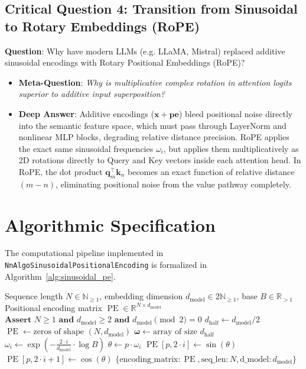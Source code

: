 \documentclass[11pt,a4paper]{article}
\theoremstyle{definition}
\begin{document}
\subsection{\textbf{Critical Question 4: Transition from Sinusoidal to Rotary Embeddings (RoPE)}}
\textbf{Question}: Why have modern LLMs (e.g. LLaMA, Mistral) replaced additive sinusoidal encodings with Rotary Positional Embeddings (RoPE)?
\begin{itemize}
    \item \textbf{Meta-Question}: \emph{Why is multiplicative complex rotation in attention logits superior to additive input superposition?}
    \item \textbf{Deep Answer}: Additive encodings ($\mathbf{x} + \mathbf{pe}$) bleed positional noise directly into the semantic feature space, which must pass through LayerNorm and nonlinear MLP blocks, degrading relative distance precision. RoPE applies the exact same sinusoidal frequencies $\omega_i$, but applies them multiplicatively as 2D rotations directly to Query and Key vectors inside each attention head. In RoPE, the dot product $\mathbf{q}_m^\top \mathbf{k}_n$ becomes an exact function of relative distance $(m-n)$, eliminating positional noise from the value pathway completely.
\end{itemize}

\section{Algorithmic Specification}

The computational pipeline implemented in \texttt{NnAlgoSinusoidalPositionalEncoding} is formalized in Algorithm~\ref{alg:sinusoidal_pe}.

\begin{algorithm}[H]
\caption{Sinusoidal Positional Encoding Generation}
\label{alg:sinusoidal_pe}
\begin{algorithmic}[1]
\Require Sequence length $N \in \mathbb{N}_{\ge 1}$, embedding dimension $d_{\text{model}} \in 2\mathbb{N}_{\ge 1}$, base $B \in \mathbb{R}_{> 1}$
\Ensure Positional encoding matrix $\operatorname{PE} \in \mathbb{R}^{N \times d_{\text{model}}}$
\State $\textbf{Assert } N \ge 1 \textbf{ and } d_{\text{model}} \ge 2 \textbf{ and } d_{\text{model}} \pmod 2 = 0$
\State $d_{\text{half}} \gets d_{\text{model}} / 2$
\State $\operatorname{PE} \gets \text{zeros of shape } (N, d_{\text{model}})$
\State $\boldsymbol{\omega} \gets \text{array of size } d_{\text{half}}$
    \State $\omega_i \gets \exp\left( -\frac{2 \cdot i}{d_{\text{model}}} \cdot \log B \right)$
\EndFor
{}
        \State $\theta \gets p \cdot \omega_i$
        \State $\operatorname{PE}[p, 2 \cdot i] \gets \sin(\theta)$ 
        \State $\operatorname{PE}[p, 2 \cdot i + 1] \gets \cos(\theta)$ 
    \EndFor
\EndFor
\State \Return $\{\text{encoding\_matrix}: \operatorname{PE}, \text{seq\_len}: N, \text{d\_model}: d_{\text{model}}\}$
\end{algorithmic}
\end{algorithm}
\end{document}
